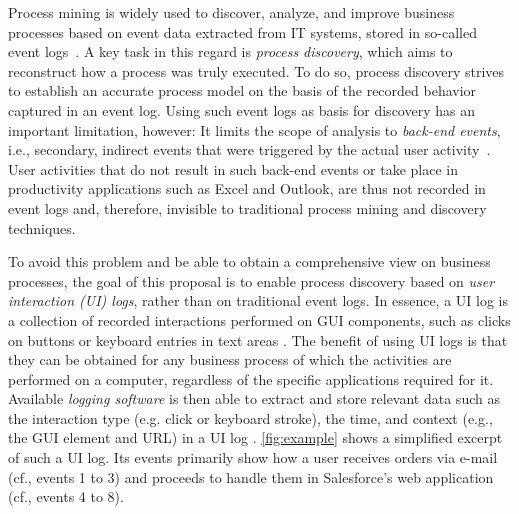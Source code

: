 \label{sec:startingpoint}

\vspace{-1em}

Process mining is widely used to discover, analyze, and improve business processes 
based on event data extracted from IT systems, stored in so-called event logs~\cite{van2016data}.
A key task in this regard is \emph{process discovery}, which aims to reconstruct how a process was truly executed. To do so, process discovery strives to establish an accurate process model on the basis of the recorded behavior captured in an event log.
Using such event logs as basis for discovery has an important limitation, however: It limits the scope of analysis to \textit{back-end events}, i.e., secondary, indirect events that were triggered by the actual user activity~\cite{diba2020extraction}. User activities that do not result in such back-end events or take place in productivity applications such as Excel and Outlook, are thus not recorded in event logs and, therefore, invisible to traditional process mining and discovery techniques. 

To avoid this problem and be able to obtain a comprehensive view on business processes, the goal of this proposal is to enable process discovery based on \textit{user interaction (UI) logs}, rather than on traditional event logs. In essence, a UI log is a collection of recorded interactions performed on GUI components, such as clicks on buttons or keyboard entries in text areas \cite{Urabe21}. The benefit of using UI logs is that they 
can be obtained for any business process of which the activities are performed on a computer, regardless of the specific applications required for it.
Available \textit{logging software} is then able to extract and store relevant data such as the interaction type (e.g. click or keyboard stroke), the time, and context (e.g., the GUI element and URL) in a UI log  \cite{leno2019action}. 
\autoref{fig:example} shows a simplified excerpt of such a UI log.
Its events primarily show how a user receives orders via e-mail (cf., events 1 to 3) and proceeds to handle them in Salesforce's web application (cf., events 4 to 8).


